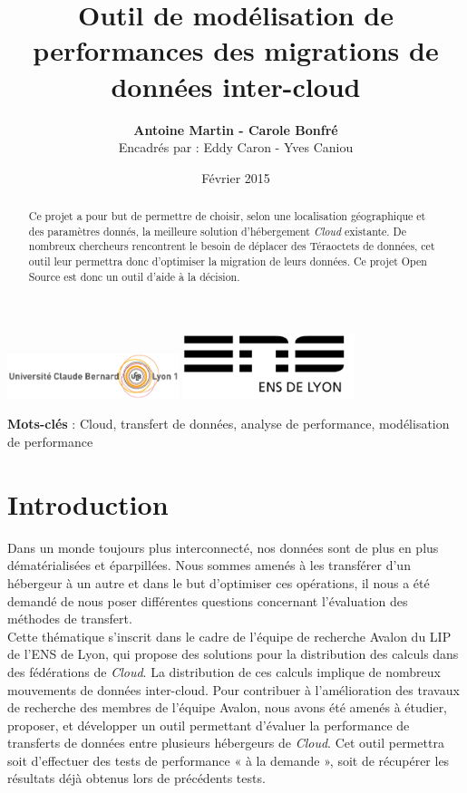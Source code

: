 \documentclass[10pt]{article}
\title{\Huge{Outil de modélisation de performances 
des migrations de données inter-cloud}}
\author{\textbf{Antoine Martin - Carole Bonfré}\\Encadrés par : Eddy Caron - Yves Caniou}
\date{Février 2015}
\begin{document}
\maketitle

\begin{center}
\includegraphics[width=5cm]{logo-lyon1.png} \hfill
\includegraphics[width=5cm]{logo-ens.png}  
\end{center}



\begin{abstract}
Ce projet a pour but de permettre de choisir, selon une
localisation géographique et des paramètres donnés, la meilleure solution
d'hébergement \textit{Cloud} existante. De nombreux chercheurs rencontrent le
besoin de déplacer des Téraoctets de données, cet outil leur permettra donc
d'optimiser la migration de leurs données. Ce projet Open Source
est donc un outil d'aide à la décision.
\end{abstract}

\textbf{Mots-clés} : Cloud, transfert de données, analyse de performance, modélisation de performance


\section{Introduction}

Dans un monde toujours plus interconnecté, nos données sont de plus en plus
dématérialisées et éparpillées. Nous sommes amenés à les transférer d’un
hébergeur à un autre et dans le but d’optimiser ces opérations, il nous a été
demandé de nous poser différentes questions concernant l’évaluation des
méthodes de transfert.\\

Cette thématique s’inscrit dans le cadre de l’équipe
de recherche Avalon du LIP de l’ENS de Lyon, qui propose des solutions pour la
distribution des calculs dans des fédérations de \textit{Cloud}. La
distribution de ces calculs implique de nombreux mouvements de données
inter-cloud. Pour contribuer à l’amélioration des travaux de recherche des
membres de l’équipe Avalon, nous avons été amenés à étudier, proposer, et
développer un outil permettant d’évaluer la performance de transferts de
données entre plusieurs hébergeurs de \textit{Cloud}. Cet outil permettra soit
d’effectuer des tests de performance « à la demande », soit de récupérer les
résultats déjà obtenus lors de précédents tests.\\
\end{document}
